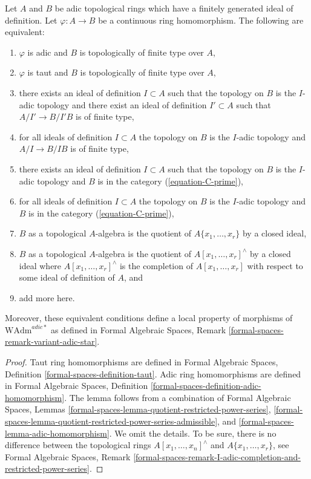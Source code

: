 \begin{lemma}
\label{lemma-finite-type}
Let $A$ and $B$ be adic topological rings which have a finitely generated
ideal of definition. Let $\varphi : A \to B$ be a continuous ring homomorphism.
The following are equivalent:
\begin{enumerate}
\item $\varphi$ is adic and $B$ is topologically of finite type over $A$,
\item $\varphi$ is taut and $B$ is topologically of finite type over $A$,
\item there exists an ideal of definition $I \subset A$ such that
the topology on $B$ is the $I$-adic topology and there exist an ideal
of definition $I' \subset A$ such that $A/I' \to B/I'B$ is of finite type,
\item for all ideals of definition $I \subset A$ the topology on $B$
is the $I$-adic topology and $A/I \to B/IB$ is of finite type,
\item there exists an ideal of definition $I \subset A$ such that
the topology on $B$ is the $I$-adic topology and $B$ is in the category
(\ref{equation-C-prime}),
\item for all ideals of definition $I \subset A$ the topology on $B$
is the $I$-adic topology and $B$ is in the category (\ref{equation-C-prime}),
\item $B$ as a topological $A$-algebra is the quotient of
$A\{x_1, \ldots, x_r\}$ by a closed ideal,
\item $B$ as a topological $A$-algebra is the quotient of
$A[x_1, \ldots, x_r]^\wedge$ by a closed ideal where
$A[x_1, \ldots, x_r]^\wedge$ is the completion of $A[x_1, \ldots, x_r]$
with respect to some ideal of definition of $A$, and
\item add more here.
\end{enumerate}
Moreover, these equivalent conditions define
a local property of morphisms of $\text{WAdm}^{adic*}$ as defined in
Formal Algebraic Spaces, Remark \ref{formal-spaces-remark-variant-adic-star}.
\end{lemma}

\begin{proof}
Taut ring homomorphisms are defined in
Formal Algebraic Spaces, Definition \ref{formal-spaces-definition-taut}.
Adic ring homomorphisms are defined in
Formal Algebraic Spaces, Definition
\ref{formal-spaces-definition-adic-homomorphism}.
The lemma follows from a combination of
Formal Algebraic Spaces, Lemmas
\ref{formal-spaces-lemma-quotient-restricted-power-series},
\ref{formal-spaces-lemma-quotient-restricted-power-series-admissible}, and
\ref{formal-spaces-lemma-adic-homomorphism}. We omit the details.
To be sure, there is no difference between the topological rings
$A[x_1, \ldots, x_n]^\wedge$ and $A\{x_1, \ldots, x_r\}$, see
Formal Algebraic Spaces, Remark
\ref{formal-spaces-remark-I-adic-completion-and-restricted-power-series}.
\end{proof}

